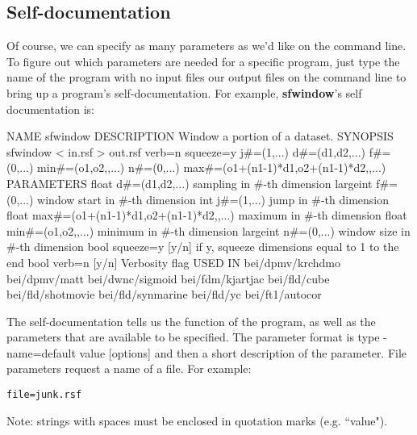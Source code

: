 \subsection{Self-documentation}
Of course, we can specify as many parameters as we'd like on the command line. To figure out which parameters are needed for a specific program, just type the name of the program with no input files our output files on the command line to bring up a program's self-documentation.  For example, \textbf{sfwindow}'s self documentation is:
\begin{verbatimtab}[4]
NAME
        sfwindow
DESCRIPTION
        Window a portion of a dataset. 
SYNOPSIS
        sfwindow < in.rsf > out.rsf verb=n squeeze=y j#=(1,...) 
        d#=(d1,d2,...) f#=(0,...) min#=(o1,o2,,...) n#=(0,...) 
        max#=(o1+(n1-1)*d1,o2+(n1-1)*d2,,...)
PARAMETERS
        float   d#=(d1,d2,...)  sampling in #-th dimension 
        largeint f#=(0,...)     window start in #-th dimension 
        int     j#=(1,...)      jump in #-th dimension 
        float   max#=(o1+(n1-1)*d1,o2+(n1-1)*d2,,...)   
            maximum in #-th dimension 
        float   min#=(o1,o2,,...)       minimum in #-th dimension 
        largeint n#=(0,...)     window size in #-th dimension 
        bool    squeeze=y [y/n] 
            if y, squeeze dimensions equal to 1 to the end 
        bool    verb=n [y/n]    Verbosity flag
USED IN
        bei/dpmv/krchdmo
        bei/dpmv/matt
        bei/dwnc/sigmoid
        bei/fdm/kjartjac
        bei/fld/cube
        bei/fld/shotmovie
        bei/fld/synmarine
        bei/fld/yc
        bei/ft1/autocor
\end{verbatimtab}

The self-documentation tells us the function of the program, as well as the parameters that are available to be specified. The parameter format is type - name=default value [options] and then a short description of the parameter. File parameters request a name of a file. For example: 
\begin{verbatim} 
file=junk.rsf 
\end{verbatim}

Note: strings with spaces must be enclosed in quotation marks (e.g. ``value").

